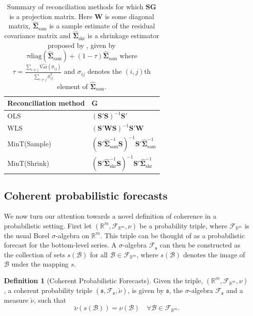 \documentclass[a4paper,12pt]{article}
\def\var{\text{Var}}
\theoremstyle{definition}
\newtheorem{definition}{Definition}[section]
\begin{document}
\begin{table}[!htb]
	\caption{Summary of reconciliation methods for which $\bm{S}\bm{G}$ is a projection matrix. Here $\bm{W}$ is some diagonal matrix, $\hat{\bm{\Sigma}}_{\text{sam}}$ is a sample estimate of the residual covariance matrix and $\hat{\bm{\Sigma}}_{\text{shr}}$ is a shrinkage estimator proposed by \citet{Schafer2005}, given by $\tau \textrm{diag}(\hat{\bm{\Sigma}}_{\text{sam}})+(1-\tau)\hat{\bm{\Sigma}}_{\text{sam}}$ where $\tau = \displaystyle\frac{\sum_{i \neq j}\hat{\var}(\hat{\sigma}_{ij})}{\sum_{i \neq j}{\hat{\sigma}}^2_{ij}}$ and $\sigma_{ij}$ denotes the $(i,j)$th element of $\hat{\bm{\Sigma}}_{\text{sam}}$.} \label{tab:ReconMethods}
	\centering
	\begin{tabular}{l@{\hskip 0.4in}l}
		\toprule
		\textbf{Reconciliation method} & $\bm{G}$ \\
		\midrule
		OLS             & $(\bm{S}'\bm{S})^{-1}\bm{S}'$ \\
		WLS             & $(\bm{S}'\bm{W}\bm{S})^{-1}\bm{S}'\bm{W}$ \\
		MinT(Sample)    & $(\bm{S}'\hat{\bm{\Sigma}}_{\text{sam}}^{-1}\bm{S})^{-1}\bm{S}' \hat{\bm{\Sigma}}_{\text{sam}}^{-1}$  \\
		MinT(Shrink)    & $(\bm{S}'\hat{\bm{\Sigma}}_{\text{shr}}^{-1}\bm{S})^{-1}\bm{S}' \hat{\bm{\Sigma}}_{\text{shr}}^{-1}$  \\
		\bottomrule
	\end{tabular}
	\label{tab:recomethods}
\end{table}

\subsection{Coherent probabilistic forecasts}

We now turn our attention towards a novel definition of coherence in a probabilistic setting. First let $(\mathbb{R}^m, \mathscr{F}_{\mathbb{R}^m}, \nu)$ be a probability triple, where $\mathscr{F}_{\mathbb{R}^m}$ is the usual Borel $\sigma$-algebra on $\mathbb{R}^m$. This triple can be thought of as a probabilistic forecast for the bottom-level series. A $\sigma$-algebra $\mathscr{F}_{\mathfrak{s}}$ can then be constructed as the collection of sets $s(\mathcal{B})$ for all $\mathcal{B}\in \mathscr{F}_{\mathbb{R}^m}$, where $s(\mathcal{B})$ denotes the image of $\mathcal{B}$ under the mapping $s$.

\begin{definition}[Coherent Probabilistic Forecasts]\label{def:cohprob}
	Given the triple, $(\mathbb{R}^m, \mathscr{F}_{\mathbb{R}^m}, \nu)$, a coherent probability triple $(\mathfrak{s}, \mathscr{F}_{\mathfrak{s}}, \breve{\nu})$, is given by $\mathfrak{s}$, the $\sigma$-algebra $\mathscr{F}_{\mathfrak{s}}$ and a measure $\breve{\nu}$, such that
	\[
	\breve{\nu}(s(\mathcal{B})) = \nu(\mathcal{B}) \quad \forall \mathcal{B} \in \mathscr{F}_{\mathbb{R}^m}.
	\]
\end{definition}
\end{document}
